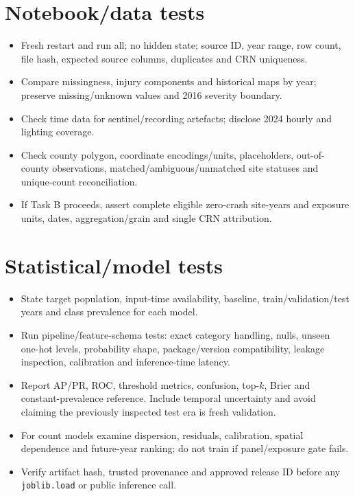 \documentclass[11pt,a4paper,openany]{report}
\newcommand{\pathcode}[1]{\nolinkurl{#1}}
\begin{document}
\section{Notebook/data tests}
\begin{itemize}
\item Fresh restart and run all; no hidden state; source ID, year range, row count, file hash, expected source columns, duplicates and CRN uniqueness.
\item Compare missingness, injury components and historical maps by year; preserve missing/unknown values and 2016 severity boundary.
\item Check time data for sentinel/recording artefacts; disclose 2024 hourly and lighting coverage.
\item Check county polygon, coordinate encodings/units, placeholders, out-of-county observations, matched/ambiguous/unmatched site statuses and unique-count reconciliation.
\item If Task B proceeds, assert complete eligible zero-crash site-years and exposure units, dates, aggregation/grain and single CRN attribution.
\end{itemize}

\section{Statistical/model tests}
\begin{itemize}
\item State target population, input-time availability, baseline, train/validation/test years and class prevalence for each model.
\item Run pipeline/feature-schema tests: exact category handling, nulls, unseen one-hot levels, probability shape, package/version compatibility, leakage inspection, calibration and inference-time latency.
\item Report AP/PR, ROC, threshold metrics, confusion, top-$k$, Brier and constant-prevalence reference. Include temporal uncertainty and avoid claiming the previously inspected test era is fresh validation.
\item For count models examine dispersion, residuals, calibration, spatial dependence and future-year ranking; do not train if panel/exposure gate fails.
\item Verify artifact hash, trusted provenance and approved release ID before any \pathcode{joblib.load} or public inference call.
\end{itemize}
\end{document}
